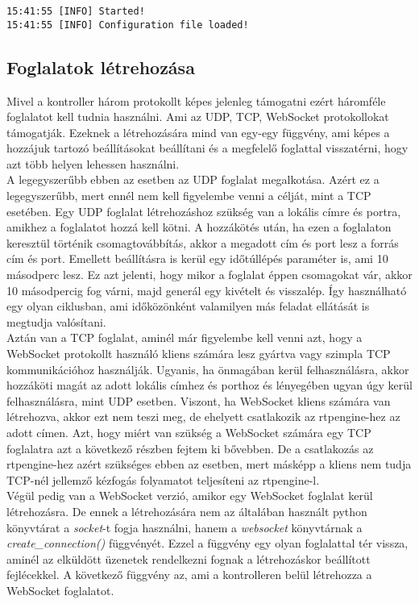 \begin{lstlisting}[caption=Naplózás formátuma, label=lst:logging]
15:41:55 [INFO] Started!
15:41:55 [INFO] Configuration file loaded!
\end{lstlisting}

\subsection{Foglalatok létrehozása}

Mivel a kontroller három protokollt képes jelenleg támogatni ezért háromféle foglalatot 
kell tudnia használni. Ami az UDP, TCP, WebSocket protokollokat támogatják. Ezeknek a
létrehozására mind van egy-egy függvény, ami képes a hozzájuk tartozó beállításokat 
beállítani és a megfelelő foglattal visszatérni, hogy azt több helyen lehessen használni. \\

A legegyszerűbb ebben az esetben az UDP foglalat megalkotása. Azért ez a legegyszerűbb,
mert ennél nem kell figyelembe venni a célját, mint a TCP esetében. Egy UDP foglalat 
létrehozáshoz szükség van a lokális címre és portra, amikhez a foglalatot hozzá kell 
kötni. A hozzákötés után, ha ezen a foglalaton keresztül történik csomagtovábbítás, 
akkor a megadott cím és port lesz a forrás cím és port. Emellett beállításra is
kerül egy időtúllépés paraméter is, ami 10 másodperc lesz. Ez azt jelenti, hogy
mikor a foglalat éppen csomagokat vár, akkor 10 másodpercig fog várni, majd generál 
egy kivételt és visszalép. Így használható egy olyan ciklusban, ami időközönként
valamilyen más feladat ellátását is megtudja valósítani. \\

Aztán van a TCP foglalat, aminél már figyelembe kell venni azt, hogy a WebSocket
protokollt használó kliens számára lesz gyártva vagy szimpla TCP kommunikációhoz 
használják. Ugyanis, ha önmagában kerül felhasználásra, akkor hozzáköti magát
az adott lokális címhez és porthoz és lényegében ugyan úgy kerül felhasználásra,
mint UDP esetben. Viszont, ha WebSocket kliens számára van létrehozva, akkor ezt
nem teszi meg, de ehelyett csatlakozik az rtpengine-hez az adott címen. Azt, hogy
miért van szükség a WebSocket számára egy TCP foglalatra azt a következő részben 
fejtem ki bővebben. De a csatlakozás az rtpengine-hez azért szükséges ebben az
esetben, mert másképp a kliens nem tudja TCP-nél jellemző kézfogás folyamatot
teljesíteni az rtpengine-l. \\

Végül pedig van a WebSocket verzió, amikor egy WebSocket foglalat kerül létrehozásra.
De ennek a létrehozására nem az általában használt python könyvtárat a \textit{socket}-t
fogja használni, hanem a \textit{websocket} \cite{websocket} könyvtárnak a \textit{create\_connection()}
függvényét. Ezzel a függvény egy olyan foglalattal tér vissza, aminél az elküldött 
üzenetek rendelkezni fognak a létrehozáskor beállított fejlécekkel. A következő 
függvény az, ami a kontrolleren belül létrehozza a WebSocket foglalatot. 

